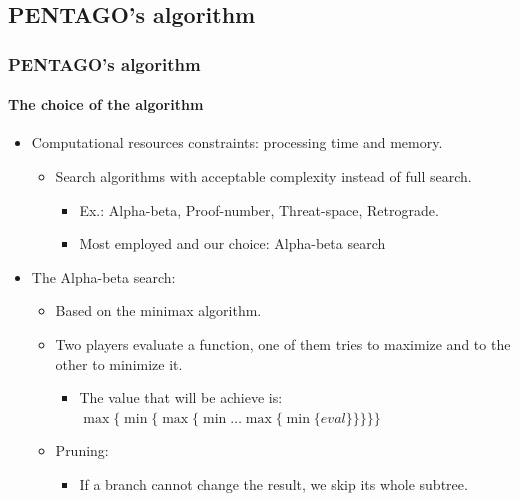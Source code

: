 \documentclass[10pt]{beamer}
\begin{document}
\subsection{PENTAGO's algorithm}
\begin{frame}
\frametitle{PENTAGO's algorithm}
\framesubtitle{The choice of the algorithm}

	\begin{itemize}
	  
		\item Computational resources constraints: processing time and memory.
		
			\begin{itemize}
			  \item Search algorithms with acceptable complexity instead of full search.
			  	\begin{itemize}
			  	  \item Ex.: Alpha-beta, Proof-number, Threat-space, Retrograde.
			  	  \item Most employed and our choice: Alpha-beta search
			  	\end{itemize}
			\end{itemize}
			
		\item The Alpha-beta search:
		
			\begin{itemize}
			  
			  \item Based on the minimax algorithm.
			  \item Two players evaluate a function, one of them tries to maximize and to
			  the other to minimize it.
			  	\begin{itemize}
			  	  \item The value that will be achieve is:\\ 
			  	  \(\max \{ \min \{ \max \{ \min \ldots \max \{ \min \{ eval \} \} \} \}
			  	  \} \)
			  	\end{itemize}
			  
			  \item Pruning:
			    \begin{itemize}
			  	  \item If a branch cannot change the result, we skip its whole subtree. 
			  	\end{itemize}
			  
			\end{itemize}
				
	\end{itemize}
\end{frame}
\end{document}
